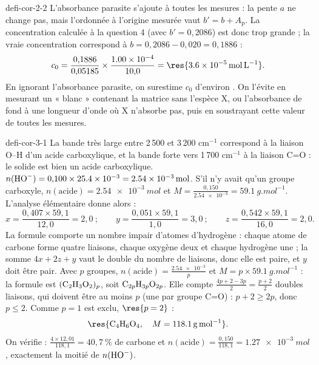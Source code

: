 \begin{blocEdition}{defi-cor-2-2}
\label{figedition-defi-cor-2-2-1}
L'absorbance parasite s'ajoute à toutes les mesures : la pente $a$ ne change pas, mais l'ordonnée à l'origine
mesurée vaut $b'=b+A_\mathrm{p}$. La concentration calculée à la question 4 (avec $b'=0{,}2086$) est donc trop
grande ; la vraie concentration correspond à $b=0{,}2086-0{,}020=0{,}1886$ :
\[c_0=\frac{0{,}1886}{0{,}05185}\times\frac{\num{1.00e-4}}{10{,}0}=\res{\qty{3,6e-5}{mol.L^{-1}}}.\]
En ignorant l'absorbance parasite, on surestime $c_0$ d'environ . On l'évite en mesurant un « blanc »
contenant la matrice sans l'espèce X, ou l'absorbance de fond à une longueur d'onde où X n'absorbe pas, puis en
soustrayant cette valeur de toutes les mesures.
\end{blocEdition}

\begin{blocEdition}{defi-cor-3-1}
La bande très large entre 2\,500 et 3\,200 cm$^{-1}$ correspond à la liaison O--H d'un acide carboxylique, et la bande
forte vers 1\,700 cm$^{-1}$ à la liaison C=O : le solide est bien un acide carboxylique.
$n(\ce{HO-})=0{,}100\times\num{25.4e-3}=\qty{2,54e-3}{mol}$. S'il n'y avait qu'un groupe carboxyle,
$n(\text{acide})=\qty{2,54e-3}{mol}$ et $M=\frac{0{,}150}{\num{2.54e-3}}=\qty{59,1}{g.mol^{-1}}$. L'analyse élémentaire donne alors :
\[x=\frac{0{,}407\times59{,}1}{12{,}0}=2{,}0\ ;\qquad y=\frac{0{,}051\times59{,}1}{1{,}0}=3{,}0\ ;\qquad z=\frac{0{,}542\times59{,}1}{16{,}0}=2{,}0.\]
La formule  comporte un nombre impair d'atomes d'hydrogène : chaque atome de carbone forme quatre liaisons,
chaque oxygène deux et chaque hydrogène une ; la somme $4x+2z+y$ vaut le double du nombre de liaisons, donc elle est
paire, et $y$ doit être pair. 
Avec $p$ groupes, $n(\text{acide})=\frac{\num{2.54e-3}}{p}$ et $M=p\times\qty{59,1}{g.mol^{-1}}$ : la formule est
$(\ce{C2H3O2})_p$, soit $\ce{C}_{2p}\ce{H}_{3p}\ce{O}_{2p}$. Elle compte $\frac{4p+2-3p}{2}=\frac{p+2}{2}$ doubles liaisons,
qui doivent être au moins $p$ (une par groupe C=O) : $p+2\geq2p$, donc $p\leq2$. Comme $p=1$ est exclu, $\res{p=2}$ :
\[\res{\ce{C4H6O4},\quad M=\qty{118,1}{g.mol^{-1}}}.\]
On vérifie : $\frac{4\times12{,}01}{118{,}1}=40{,}7~\%$ de carbone et $n(\text{acide})=\frac{0{,}150}{118{,}1}=\qty{1,27e-3}{mol}$,
exactement la moitié de $n(\ce{HO-})$.
\end{blocEdition}

